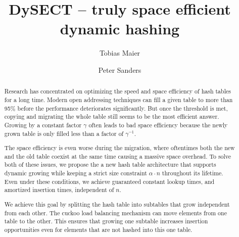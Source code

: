 \documentclass[a4paper,UKenglish]{lipics-v2016}
\title{DySECT -- truly space efficient dynamic hashing} %
\author[1]{Tobias Maier}
\author[1]{Peter Sanders}
\affil[1]{Karlsruhe Institute of Technology, Karlsruhe, Deutschland\\
  \texttt{\{t.maier, sanders\}@kit.edu}}
\begin{document}
\maketitle

\begin{abstract}
Research has concentrated on optimizing the speed and space efficiency
of hash tables for a long time.  Modern open addressing techniques can
fill a given table to more than 95\% before the performance
deteriorates significantly.  But once the threshold is met, copying
and migrating the whole table still seems to be the most efficient
answer.  Growing by a constant factor $\gamma$ often leads to bad
space efficiency because the newly grown table is only filled less
than a factor of $\gamma^{-1}$.

The space efficiency is even worse during the migration, where
oftentimes both the new and the old table coexist at the same time
causing a massive space overhead.  To solve both of these issues, we
propose the a new hash table architecture that supports dynamic
growing while keeping a strict size constraint $\alpha \cdot n$
throughout its lifetime.  Even under these conditions, we achieve
guaranteed constant lookup times, and amortized insertion times,
independent of $n$.

We achieve this goal by splitting the hash table into subtables that
grow independent from each other.  The cuckoo load balancing mechanism
can move elements from one table to the other.  This ensures that
growing one subtable increases insertion opportunities even for
elements that are not hashed into this one table.
 \end{abstract}
\end{document}

